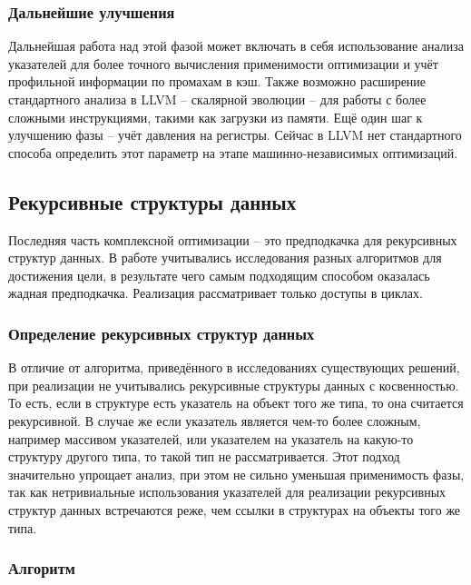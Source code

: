 \documentclass[12pt,a4paper]{article}
\begin{document}
\subsubsection{Дальнейшие улучшения}

\indent

Дальнейшая работа над этой фазой может включать в себя использование анализа указателей для более точного вычисления применимости оптимизации и учёт профильной информации по промахам в кэш. Также возможно расширение стандартного анализа в LLVM -- скалярной эволюции -- для работы с более сложными инструкциями, такими как загрузки из памяти. Ещё один шаг к улучшению фазы -- учёт давления на регистры. Сейчас в LLVM нет стандартного способа определить этот параметр на этапе машинно-независимых оптимизаций.

\subsection{Рекурсивные структуры данных}

\indent

Последняя часть комплексной оптимизации -- это предподкачка для рекурсивных структур данных. В работе учитывались исследования разных алгоритмов для достижения цели, в результате чего самым подходящим способом оказалась жадная предподкачка. Реализация рассматривает только доступы в циклах.

\subsubsection{Определение рекурсивных структур данных}

\indent

В отличие от алгоритма, приведённого в исследованиях существующих решений, при реализации не учитывались рекурсивные структуры данных с косвенностью. То есть, если в структуре есть указатель на объект того же типа, то она считается рекурсивной. В случае же если указатель является чем-то более сложным, например массивом указателей, или указателем на указатель на какую-то структуру другого типа, то такой тип не рассматривается. Этот подход значительно упрощает анализ, при этом не сильно уменьшая применимость фазы, так как нетривиальные использования указателей для реализации рекурсивных структур данных встречаются реже, чем ссылки в структурах на объекты того же типа.

\subsubsection{Алгоритм}
\end{document}
